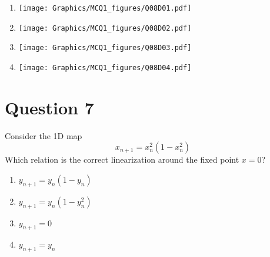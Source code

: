 \documentclass[twoside,10pt,a4paper]{article}
\begin{document}
\begin{enumerate}[label=(\alph*)]
	\item \texttt{[image: Graphics/MCQ1\_figures/Q08D01.pdf]}
	\item \texttt{[image: Graphics/MCQ1\_figures/Q08D02.pdf]}
	\item \texttt{[image: Graphics/MCQ1\_figures/Q08D03.pdf]}
	\item \texttt{[image: Graphics/MCQ1\_figures/Q08D04.pdf]}
\end{enumerate}

\section*{Question 7}
Consider the 1D map
\begin{equation*}
	x_{n+1} = x_n^2(1 - x_n^2)
\end{equation*}
Which relation is the correct linearization around the fixed point $x = 0$?

\begin{enumerate}[label=(\alph*)]
	\item $ y_{n+1} = y_n(1 - y_n) $
	\item $ y_{n+1} = y_n(1 - y_n^2) $
	\item $ y_{n+1} = 0 $
	\item $ y_{n+1} = y_n $
\end{enumerate}
\end{document}
